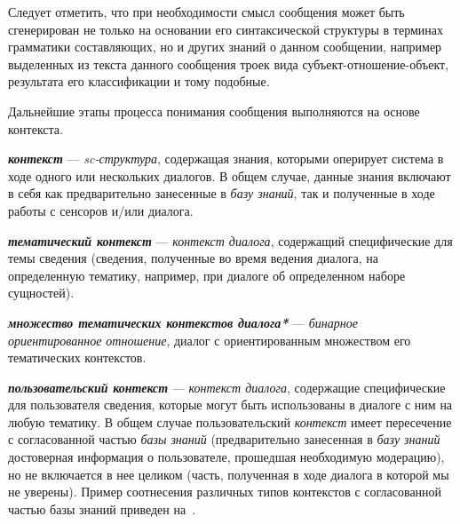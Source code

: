Следует отметить, что при необходимости смысл сообщения может быть сгенерирован не только на основании его синтаксической структуры в терминах грамматики составляющих, но и других знаний о данном сообщении, например выделенных из текста данного сообщения троек вида субъект-отношение-объект, результата его классификации и тому подобные.

Дальнейшие этапы процесса понимания сообщения выполняются на основе контекста.

\textbf{\textit{контекст}} --- \textit{sc-структура}, содержащая знания, которыми оперирует система в ходе одного или нескольких диалогов.
В общем случае, данные знания включают в себя как предварительно занесенные в \textit{базу знаний}, так и полученные в ходе работы с сенсоров и/или диалога.

\begin{SCn}

    \begin{scnindent}
        \begin{scneqtoset}
        \end{scneqtoset}
    \end{scnindent}

\end{SCn}

\textbf{\textit{тематический контекст}} --- \textit{контекст диалога}, содержащий специфические для темы сведения (сведения, полученные во время ведения диалога, на определенную тематику, например, при диалоге об определенном наборе сущностей).

\textbf{\textit{множество тематических контекстов диалога*}} --- \textit{бинарное ориентированное отношение}, диалог с ориентированным множеством его тематических контекстов.

\textbf{\textit{пользовательский контекст}} --- \textit{контекст диалога}, содержащие специфические для пользователя сведения, которые могут быть использованы в диалоге с ним на любую тематику.
В общем случае пользовательский \textit{контекст} имеет пересечение с согласованной частью \textit{базы знаний} (предварительно занесенная в \textit{базу знаний} достоверная информация о пользователе, прошедшая необходимую модерацию), но не включается в нее целиком (часть, полученная в ходе диалога в которой мы не уверены).
Пример соотнесения различных типов контекстов с согласованной частью базы знаний приведен на~\textit{}.

